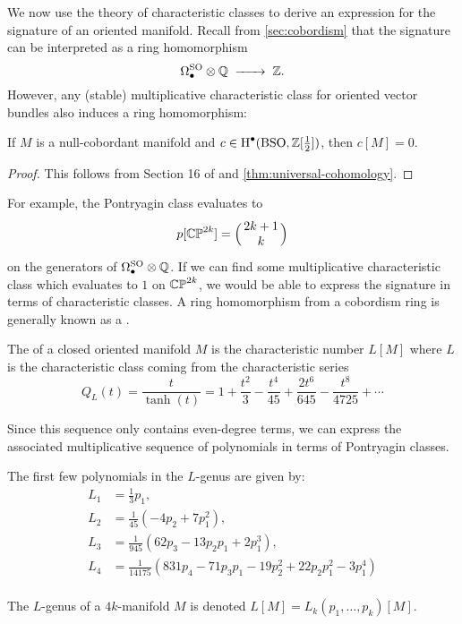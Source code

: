 We now use the theory of characteristic classes to derive an expression for the signature of an oriented manifold. Recall from \cref{sec:cobordism} that the signature can be interpreted as a ring homomorphism
\[
		\Omega_\bullet^\SO \otimes \Q \lkxto \Z.
\]
However, any (stable) multiplicative characteristic class for oriented vector bundles also induces a ring homomorphism:
\begin{proposition}
	If $M$ is a null-cobordant manifold and $c\in \operatorname{H}^\bullet(\mathrm{BSO}, \mathbb{Z}[\frac12])$, then $c[M]=0$.
\end{proposition}
\begin{proof}
	This follows from Section 16 of \cite{milnorstasheff1974} and \cref{thm:universal-cohomology}.
\end{proof}
For example, the Pontryagin class evaluates to
\[
		p[\CP^{2k}] = \binom{2k+1}{k}
\]
on the generators of $\Omega_\bullet^{\mathrm{SO}}\otimes \mathbb{Q}$. If we can find some multiplicative characteristic class which evaluates to $1$ on $\mathbb{CP}^{2k}$, we would be able to express the signature in terms of characteristic classes. A ring homomorphism from a cobordism ring is generally known as a .

\begin{definition}
	The  of a closed oriented manifold $M$ is the characteristic number $L[M]$ where $L$ is the characteristic class coming from the characteristic series
	\[
		Q_{L}(t) = \frac{t}{\tanh(t)}=1+\frac{t^2}{3} - \frac{t^4}{45} + \frac{2t^6}{645}-\frac{t^8}{4725}+\cdots
	\]
\end{definition}

Since this sequence only contains even-degree terms, we can express the associated multiplicative sequence of polynomials in terms of Pontryagin classes.

\begin{example}\label{example:L-genus}
	The first few polynomials in the $L$-genus are given by:
	\[
		\begin{aligned}
			L_1 &= \frac{1}{3}p_1,\\
			L_2 &= \frac{1}{45}(-4p_2 + 7p_1^2),\\
			L_3 &= \frac{1}{945}(62p_3-13p_2p_1+2p_1^3),\\
			L_4 &= \frac{1}{14175}(831p_4-71p_3p_1-19p_2^2 + 22p_2p_1^2 - 3p_1^4)\\
		\end{aligned}
	\]
\end{example}

\begin{definition}
	The $L$-genus of a $4k$-manifold $M$ is denoted $L[M]=L_k(p_1,\ldots, p_k)[M]$.
\end{definition}

